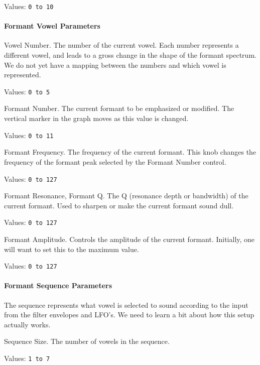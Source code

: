    Values:  \texttt{0 to 10}

\paragraph{Formant Vowel Parameters}
\label{paragraph:formant_vowel_parameters}

   Vowel Number.
   The number of the current vowel.
   Each number represents a different vowel, and leads to a gross change in the
   shape of the formant spectrum.
   We do not yet have a mapping between the numbers and which vowel is
   represented.

   Values:  \texttt{0 to 5}

   Formant Number.
   The current formant to be emphasized or modified.  The vertical marker in
   the graph moves as this value is changed.

   Values:  \texttt{0 to 11}

   Formant Frequency.
   The frequency of the current formant.
   This knob changes the frequency of the formant peak selected by the
   Formant Number control.

   Values:  \texttt{0 to 127}

   Formant Resonance, Formant Q.
   The Q (resonance depth or bandwidth) of the current formant.
   Used to sharpen or make the current formant sound dull.

   Values:  \texttt{0 to 127}

   Formant Amplitude.
   Controls the amplitude of the current formant.
   Initially, one will want to set this to the maximum value.

   Values:  \texttt{0 to 127}

\paragraph{Formant Sequence Parameters}
\label{paragraph:formant_sequence_parameters}

   The sequence represents what vowel is selected to sound according to the
   input from the filter envelopes and LFO's.
   We need to learn a bit about how this setup actually works.

   Sequence Size.
   The number of vowels in the sequence.

   Values:  \texttt{1 to 7}

